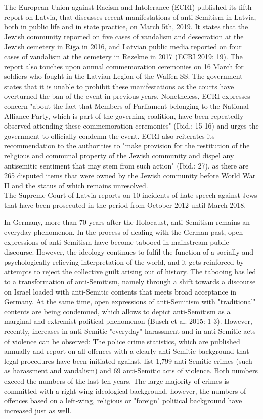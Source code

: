 The European Union against Racism and Intolerance (ECRI) published its fifth report on Latvia, that discusses recent manifestations of anti-Semitism in Latvia, both in public life and in state practice, on March 5th, 2019. It states that the Jewish community reported on five cases of vandalism and desecration at the Jewish cemetery in Riga in 2016, and Latvian public media reported on four cases of vandalism at the cemetery in Rezekne in 2017 (ECRI 2019: 19). The report also touches upon annual commemoration ceremonies on 16 March for soldiers who fought in the Latvian Legion of the Waffen SS. The government states that it is unable to prohibit these manifestations as the courts have overturned the ban of the event in previous years. Nonetheless, ECRI expresses concern "about the fact that Members of Parliament belonging to the National Alliance Party, which is part of the governing coalition, have been repeatedly observed attending these commemoration ceremonies" (Ibid.: 15-16) and urges the government to officially condemn the event. ECRI also reiterates its recommendation to the authorities to "make provision for the restitution of the religious and communal property of the Jewish community and dispel any antisemitic sentiment that may stem from such action" (Ibid.: 27), as there are 265 disputed items that were owned by the Jewish community before World War II and the status of which remains unresolved. \\
The Supreme Court of Latvia reports on 10 incidents of hate speech against Jews that have been prosecuted in the period from October 2012 until March 2018. \par
In Germany, more than 70 years after the Holocaust, anti-Semitism remains an everyday phenomenon. In the process of dealing with the German past, open expressions of anti-Semitism have become tabooed in mainstream public discourse. However, the ideology continues to fulfil the function of a socially and psychologically relieving interpretation of the world, and it gets reinforced by attempts to reject the collective guilt arising out of history. The tabooing has led to a transformation of anti-Semitism, namely through a shift towards a discourse on Israel loaded with anti-Semitic contents that meets broad acceptance in Germany. At the same time, open expressions of anti-Semitism with "traditional" contents are being condemned, which allows to depict anti-Semitism as a marginal and extremist political phenomenon (Busch et al. 2015: 1-3). However, recently, increases in anti-Semitic "everyday" harassment and in anti-Semitic acts of violence can be observed: The police crime statistics, which are published annually and report on all offences with a clearly anti-Semitic background that legal procedures have been initiated against, list 1,799 anti-Semitic crimes (such as harassment and vandalism) and 69 anti-Semitic acts of violence. Both numbers exceed the numbers of the last ten years. The large majority of crimes is committed with a right-wing ideological background, however, the numbers of offences based on a left-wing, religious or "foreign" political background have increased just as well. \\
